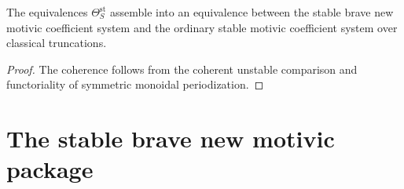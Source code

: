 \begin{corollary}
\label{cor:stable-coefficient-comparison}
The equivalences $\Theta_S^{\mathrm{st}}$ assemble into an equivalence between the stable brave new
motivic coefficient system and the ordinary stable motivic coefficient system over classical
truncations.
\end{corollary}

\begin{proof}
The coherence follows from the coherent unstable comparison and functoriality of symmetric
monoidal periodization.
\end{proof}

\section{The stable brave new motivic package}
\label{sec:stable-package}


